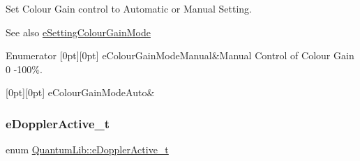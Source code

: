 Set Colour Gain control to Automatic or Manual Setting. \begin{DoxySeeAlso}{See also}
\mbox{\hyperlink{namespace_quantum_lib_acc8124e3e65bca4aa798d03a55e3d54cafef9f6dac71f11bdb6b97750953d140b}{e\+Setting\+Colour\+Gain\+Mode}} 
\end{DoxySeeAlso}
\begin{DoxyEnumFields}{Enumerator}
[0pt][0pt]{}\mbox{\label{namespace_quantum_lib_a4e404872667f9386ba59973f4b29fe65adb01dba5bfcbd360b1b300c68ed69a19}} 
e\+Colour\+Gain\+Mode\+Manual&Manual Control of Colour Gain 0 -\/100\%. \\
\hline

[0pt][0pt]{}\mbox{\label{namespace_quantum_lib_a4e404872667f9386ba59973f4b29fe65a7901bfdc2703d0960d3ce3dd04e51474}} 
e\+Colour\+Gain\+Mode\+Auto&\\
\hline

\end{DoxyEnumFields}
\mbox{\label{namespace_quantum_lib_a7a034f49c93f16195096c2ecf89432d4}} 
\subsubsection{\texorpdfstring{e\+Doppler\+Active\+\_\+t}{eDopplerActive\_t}}
{\footnotesize\ttfamily enum \mbox{\hyperlink{namespace_quantum_lib_a7a034f49c93f16195096c2ecf89432d4}{Quantum\+Lib\+::e\+Doppler\+Active\+\_\+t}}}

